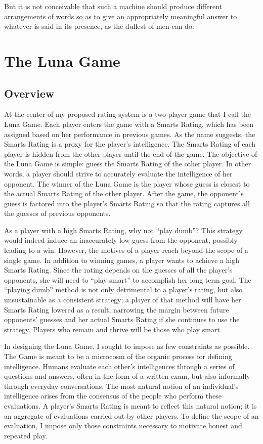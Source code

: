 \begin{savequote}[75mm]
But it is not conceivable that such a machine should produce different arrangements of words so as to give an appropriately meaningful answer to whatever is said in its presence, as the dullest of men can do.
\end{savequote}

\chapter{The Luna Game}

\section{Overview}

At the center of my proposed rating system is a two-player game that I call the Luna Game. Each player enters the game with a Smarts Rating, which has been assigned based on her performance in previous games. As the name suggests, the Smarts Rating is a proxy for the player's intelligence. The Smarts Rating of each player is hidden from the other player until the end of the game. The objective of the Luna Game is simple: guess the Smarts Rating of the other player. In other words, a player should strive to accurately evaluate the intelligence of her opponent. The winner of the Luna Game is the player whose guess is closest to the actual Smarts Rating of the other player. After the game, the opponent's guess is factored into the player's Smarts Rating so that the rating captures all the guesses of previous opponents.

As a player with a high Smarts Rating, why not ``play dumb''? This strategy would indeed induce an inaccurately low guess from the opponent, possibly leading to a win. However, the motives of a player reach beyond the scope of a single game. In addition to winning games, a player wants to achieve a high Smarts Rating. Since the rating depends on the guesses of all the player's opponents, she will need to ``play smart'' to accomplish her long term goal. The ``playing dumb'' method is not only detrimental to a player's rating, but also unsustainable as a consistent strategy; a player of that method will have her Smarts Rating lowered as a result, narrowing the margin between future opponents' guesses and her actual Smarts Rating if she continues to use the strategy. Players who remain and thrive will be those who play smart.

In designing the Luna Game, I sought to impose as few constraints as possible. The Game is meant to be a microcosm of the organic process for defining intelligence. Humans evaluate each other's intelligences through a series of questions and answers, often in the form of a written exam, but also informally through everyday conversations. The most natural notion of an individual's intelligence arises from the consensus of the people who perform these evaluations. A player's Smarts Rating is meant to reflect this natural notion; it is an aggregate of evaluations carried out by other players. To define the scope of an evaluation, I impose only those constraints necessary to motivate honest and repeated play.

